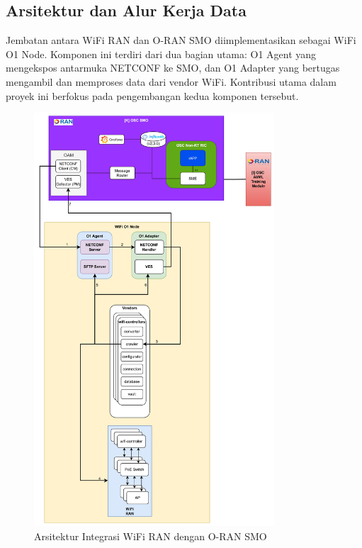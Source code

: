 \subsection{Arsitektur dan Alur Kerja Data}
Jembatan antara WiFi RAN dan O-RAN SMO diimplementasikan sebagai WiFi O1 Node. Komponen ini terdiri dari dua bagian utama: O1 Agent yang mengekspos antarmuka NETCONF ke SMO, dan O1 Adapter yang bertugas mengambil dan memproses data dari vendor WiFi. Kontribusi utama dalam proyek ini berfokus pada pengembangan kedua komponen tersebut.

\begin{figure}[htbp]
    \centering
    \includegraphics[width=0.8\textwidth]{assets/pics/smo_architecture.jpg}
    \caption{Arsitektur Integrasi WiFi RAN dengan O-RAN SMO}
    \label{fig:smo_architecture}
\end{figure}

